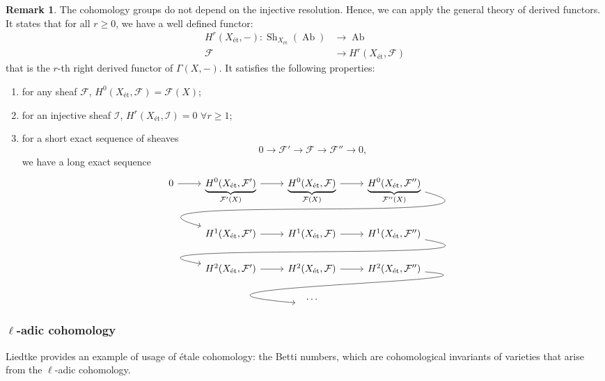 \documentclass{report}
\DeclareMathOperator{\Sh}{Sh}
\DeclareMathOperator{\Ab}{Ab}
\theoremstyle{definition}
\newtheorem{remark}[equation]{Remark}
\begin{document}
\begin{remark}
The cohomology groups do not depend on the injective resolution. Hence, we can apply the general theory of derived functors. It states that for all $r\geq0$, we have a well defined functor:
\begin{align*}
H^r(X_{\text{\'{e}t}},-):\Sh_{X_{\text{\'{e}t}}}(\Ab)&\longrightarrow\Ab\\
\mathcal{F}&\longrightarrow H^r(X_{\text{\'{e}t}},\mathcal{F})
\end{align*}
that is the $r$-th right derived functor of $\Gamma(X,-)$. It satisfies the following properties:
\begin{enumerate}
\item for any sheaf $\mathcal{F}$, $H^0(X_{\text{\'{e}t}},\mathcal{F})=\mathcal{F}(X)$;
\item for an injective sheaf $\mathcal{I}$, $H^r(X_{\text{\'{e}t}},\mathcal{I})=0$ $\forall r\geq1$;
\item for a short exact sequence of sheaves
\[0\longrightarrow\mathcal{F}'\longrightarrow\mathcal{F}\longrightarrow\mathcal{F}''\longrightarrow0,\]
we have a long exact sequence
\[
\begin{tikzcd}
0\arrow[r]&\underbrace{H^0(X_{\text{\'{e}t}},\mathcal{F}')}_{\mathcal{F}'(X)}\arrow[r]&\underbrace{H^0(X_{\text{\'{e}t}},\mathcal{F})}_{\mathcal{F}(X)}\arrow[r]&\underbrace{H^0(X_{\text{\'{e}t}},\mathcal{F}'')}_{\mathcal{F}''(X)}\arrow[lld,out=345,in=165,looseness=1.4]\\
&H^1(X_{\text{\'{e}t}},\mathcal{F}')\arrow[r]&H^1(X_{\text{\'{e}t}},\mathcal{F})\arrow[r]&H^1(X_{\text{\'{e}t}},\mathcal{F}'')\arrow[lld,out=350,in=170,looseness=1.4]\\
&H^2(X_{\text{\'{e}t}},\mathcal{F}')\arrow[r]&H^2(X_{\text{\'{e}t}},\mathcal{F})\arrow[r]&H^2(X_{\text{\'{e}t}},\mathcal{F}'')\arrow[lld,out=355,in=175,looseness=1.4,shorten >= -2.5cm]\\
&\null&\ldots
\end{tikzcd}
\]
\end{enumerate}
\end{remark}

\subsubsection*{$\boldsymbol{\ell}$-adic cohomology}

Liedtke \cite[Section~1.3]{liedtke2016lectures} provides an example of usage of \'{e}tale cohomology: the Betti numbers, which are cohomological invariants of varieties that arise from the $\ell$-adic cohomology.
\end{document}
